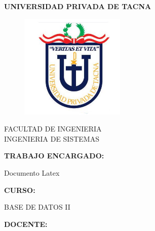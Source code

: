 \documentclass[12pt,letterpaper]{article}
\begin{document}
\begin{titlepage}
\begin{center}


\begin{Large}
\textbf{UNIVERSIDAD PRIVADA DE TACNA} \\
\end{Large}


\vspace*{-0.015in}
\begin{figure}[htb]
\begin{center}
\includegraphics[width=5cm]{./imagenes/logo}
\end{center}
\end{figure}
FACULTAD DE INGENIERIA\\
\vspace*{0.05in}
INGENIERIA DE SISTEMAS  \\


\vspace*{0.5in}
\begin{Large}
\textbf{TRABAJO ENCARGADO:} \\
\end{Large}


\vspace*{0.1in}
\begin{large}
Documento Latex\\
\end{large}




\vspace*{0.3in}
\begin{Large}
\textbf{CURSO:} \\
\end{Large}

\vspace*{0.1in}
\begin{large}
BASE DE DATOS II\\
\end{large}

\vspace*{0.3in}
\begin{Large}
\textbf{DOCENTE:} \\
\end{Large}


\end{center}
\end{titlepage}
\end{document}
